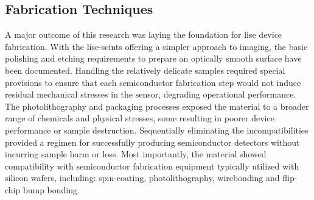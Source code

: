 \documentclass[../../../main.tex]{subfiles}%
\begin{document}
%
    \subsection{Fabrication Techniques}%
    \label{sec:chapter-5:outcomes:fabrication}%
    A major outcome of this research was laying the foundation for \gls{lise} device fabrication.
    With the \glspl{lise-scint} offering a simpler approach to imaging, the basic polishing and etching requirements to prepare an optically smooth surface have been documented.
    Handling the relatively delicate samples required special provisions to ensure that each semiconductor fabrication step would not induce residual mechanical stresses in the sensor, degrading operational performance.
    The photolithography and packaging processes exposed the material to a broader range of chemicals and physical stresses, some resulting in poorer device performance or sample destruction.
    Sequentially eliminating the incompatibilities provided a regimen for successfully producing semiconductor detectors without incurring sample harm or loss.
    Most importantly, the material showed compatibility with semiconductor fabrication equipment typically utilized with silicon wafers, including: spin-coating, photolithography, wirebonding and flip-chip bump bonding.
\end{document}
